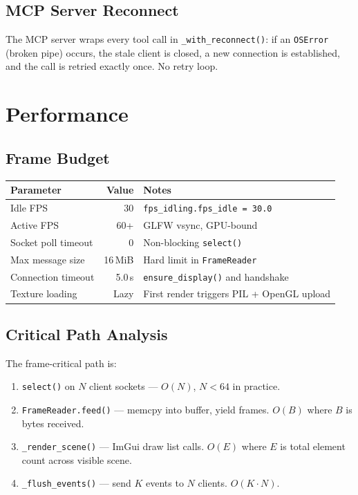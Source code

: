 \documentclass[a4paper,10pt]{article}
\begin{document}
\subsection{MCP Server Reconnect}

The MCP server wraps every tool call in
\texttt{\_with\_reconnect()}: if an \texttt{OSError} (broken pipe)
occurs, the stale client is closed, a new connection is established,
and the call is retried exactly once.  No retry loop.

\section{Performance}

\subsection{Frame Budget}

\begin{center}
\begin{tabular}{lrl}
\toprule
\textbf{Parameter} & \textbf{Value} & \textbf{Notes} \\
\midrule
Idle FPS            & 30             & \texttt{fps\_idling.fps\_idle = 30.0} \\
Active FPS          & 60+            & GLFW vsync, GPU-bound \\
Socket poll timeout & 0              & Non-blocking \texttt{select()} \\
Max message size    & 16\,MiB        & Hard limit in \texttt{FrameReader} \\
Connection timeout  & 5.0\,s         & \texttt{ensure\_display()} and handshake \\
Texture loading     & Lazy           & First render triggers PIL + OpenGL upload \\
\bottomrule
\end{tabular}
\end{center}

\subsection{Critical Path Analysis}

The frame-critical path is:

\begin{enumerate}
  \item \texttt{select()} on $N$ client sockets --- $O(N)$, $N < 64$
    in practice.
  \item \texttt{FrameReader.feed()} --- memcpy into buffer, yield
    frames.  $O(B)$ where $B$ is bytes received.
  \item \texttt{\_render\_scene()} --- ImGui draw list calls.
    $O(E)$ where $E$ is total element count across visible scene.
  \item \texttt{\_flush\_events()} --- send $K$ events to $N$
    clients.  $O(K \cdot N)$.
\end{enumerate}
\end{document}
